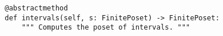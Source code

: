 \par\begin{minipage}{60ex}
\begin{verbatim}
@abstractmethod
def intervals(self, s: FinitePoset) -> FinitePoset:
    """ Computes the poset of intervals. """
\end{verbatim}
\end{minipage}\par